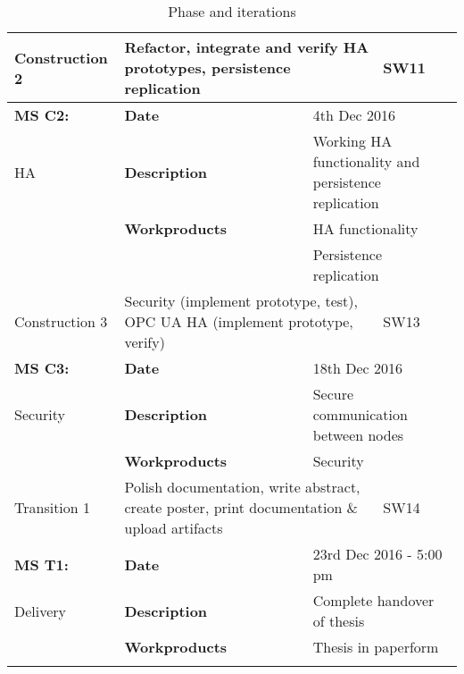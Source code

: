 \begin{center}
\begin{longtable}{ | p{25mm} | p{25mm} p{35mm}| p{5mm} | }
	Construction 2
	& \multicolumn{2}{l|}{Refactor, integrate and verify HA prototypes, persistence replication}
	& SW11 \\ \hline
	\textbf{MS C2:}
	& \textbf{Date}
	& \multicolumn{2}{l|}{4th Dec 2016} \\
	HA & \textbf{Description}
	& \multicolumn{2}{l|}{Working HA functionality and persistence replication} \\
	& \textbf{Workproducts}
	& \multicolumn{2}{l|}{HA functionality} \\
	& & \multicolumn{2}{l|}{Persistence replication} \\ \hline
	Construction 3
	& \multicolumn{2}{p{70mm}|}{Security (implement prototype, test), OPC UA HA (implement prototype, verify)}
	& SW13 \\ \hline
	\textbf{MS C3:}
	& \textbf{Date}
	& \multicolumn{2}{l|}{18th Dec 2016} \\
	Security & \textbf{Description}
	& \multicolumn{2}{l|}{Secure communication between nodes} \\
	& \textbf{Workproducts}
	& \multicolumn{2}{l|}{Security} \\
	\hline
	\hline

	Transition 1
	& \multicolumn{2}{p{70mm}|}{Polish documentation, write abstract, create poster, print documentation \& upload artifacts}
	& SW14 \\ \hline
	\textbf{MS T1:}
	& \textbf{Date}
	& \multicolumn{2}{l|}{23rd Dec 2016 - 5:00 pm} \\
	Delivery & \textbf{Description}
	& \multicolumn{2}{l|}{Complete handover of thesis} \\
	& \textbf{Workproducts}
	& \multicolumn{2}{l|}{Thesis in paperform} \\
	\hline
	\hline

   \caption{Phase and iterations} \label{tab:phases}
   \end{longtable}
\end{center}
